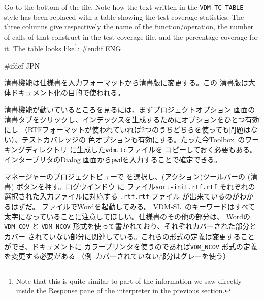 \documentclass[\pformat,12pt]{article}
\newcommand{\vdmslpp}{VDM-SL}
\newcommand{\Toolbox}{Toolbox}
\newcommand{\vdmslpp}{VDM++}
\newcommand{\Toolbox}{Toolbox}
\newcommand{\guicmd}[1]{{\sf #1}}
\newcommand{\guicmd}[1]{{\gt #1}}
\begin{document}
Go to the bottom of the  file. Note how the
text written in the {\tt VDM\_TC\_TABLE} style has been replaced with a
table showing the test coverage statistics. The three columns give
respectively the name of the function/operation, the number of calls
of that construct in 
the test coverage file, and the percentage coverage for it. The table
looks like\footnote{Note that this is quite similar to part of the
information we saw directly inside the \guicmd{Response} pane of
the interpreter in the previous section.}:
#endif ENG

#ifdef JPN

清書機能は仕様書を入力フォーマットから清書版に変更する。この
清書版は大体ドキュメント化の目的で使われる。
  
清書機能が動いているところを見るには、まず\guicmd{プロジェクトオプション} 画面の
\guicmd{清書}タブをクリックし、インデックスを生成するためにオプションをひとつ有効にし
（RTFフォーマットが使われていれば2つのうちどちらを使っても問題はない）、テストカバレッジの
色オプションも有効にする。たった今\Toolbox\ のワーキングディレクトリ に生成した{\tt vdm.tc}ファイルを
コピーしておく必要もある。インタープリタの\guicmd{Dialog} 画面から{\tt pwd}を入力することで確定できる。

\guicmd{マネージャー}の\guicmd{プロジェクトビュー}で
を選択し、(\guicmd{アクション})ツールバーの 
(\guicmd{清書}) ボタンを押す。\guicmd{ログウインドウ} に
{
ファイル{\tt sort-init.rtf.rtf}
}
{
それぞれの選択された入力ファイルに対応する {\tt .rtf.rtf} ファイル
}
が出来ているのがわかるはずだ。
ファイルでWordを起動してみる。
\vdmslpp\ のキーワードはすべて太字になっていることに注意してほしい。仕様書のその他の部分は、
Wordの{\tt VDM\_COV}  と  {\tt VDM\_NCOV} 形式を使って書かれており、それぞれカバーされた部分とカバー
されていない部分に関連している。これらの形式の定義は変更することができ、ドキュメントに
カラープリンタを使うのであれば{\tt VDM\_NCOV} 形式の定義を変更する必要がある
（例\ カバーされていない部分はグレーを使う）
\end{document}
